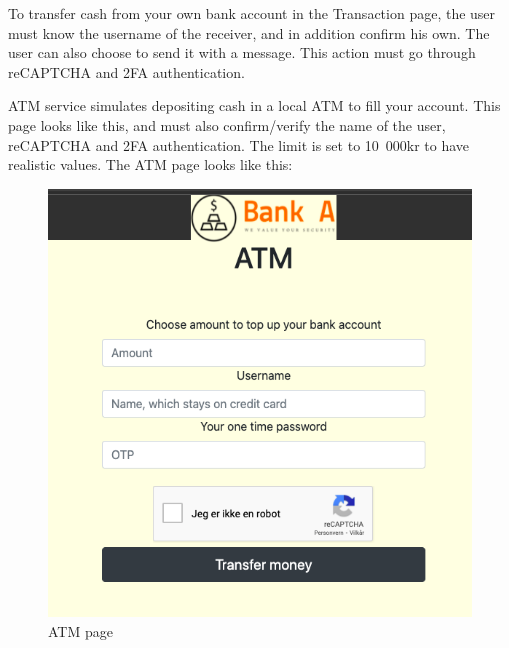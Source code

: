 To transfer cash from your own bank account in the Transaction page, the user must know the username of the receiver, and in addition confirm his own. The user can also choose to send it with a message. This action must go through reCAPTCHA and 2FA authentication. 

ATM service simulates depositing cash in a local ATM to fill your account. This page looks like this, and must also confirm/verify the name of the user, reCAPTCHA and 2FA authentication. The limit is set to 10 000kr to have realistic values. The ATM page looks like this:

\begin{figure}[H]
    \centering
    \includegraphics[width=\textwidth]{pics/atmPage.png}
    \caption{ATM page}
    \label{fig:cha1fig3.2atmpage}
\end{figure}